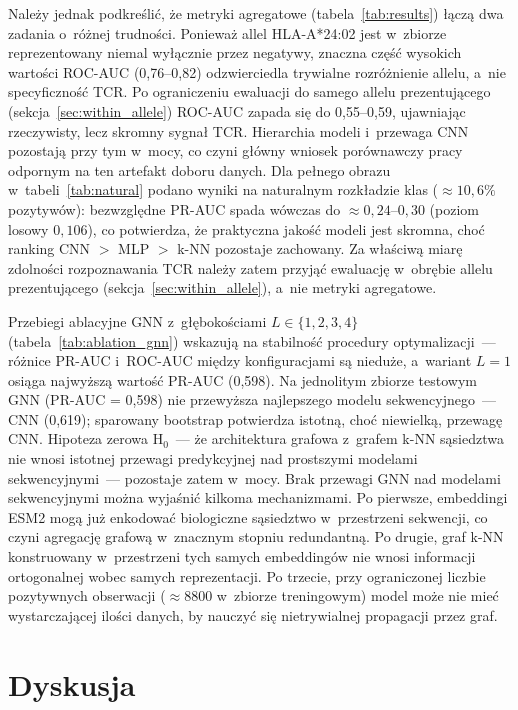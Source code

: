 \documentclass{SGGW-thesis}
\begin{document}
Należy jednak podkreślić, że metryki agregatowe (tabela~\ref{tab:results}) łączą dwa
zadania o~różnej trudności. Ponieważ allel HLA-A*24:02 jest w~zbiorze reprezentowany niemal wyłącznie przez negatywy,
znaczna część wysokich wartości ROC-AUC (0{,}76--0{,}82) odzwierciedla trywialne
rozróżnienie allelu, a~nie specyficzność TCR. Po ograniczeniu ewaluacji do samego allelu
prezentującego (sekcja~\ref{sec:within_allele}) ROC-AUC zapada się do 0{,}55--0{,}59,
ujawniając rzeczywisty, lecz skromny sygnał TCR. Hierarchia modeli i~przewaga CNN
pozostają przy tym w~mocy, co czyni główny wniosek porównawczy pracy odpornym na ten
artefakt doboru danych. Dla pełnego obrazu w~tabeli~\ref{tab:natural} podano wyniki na
naturalnym rozkładzie klas (${\approx}10{,}6\%$ pozytywów): bezwzględne PR-AUC spada wówczas do
${\approx}0{,}24$--$0{,}30$ (poziom losowy $0{,}106$), co potwierdza, że praktyczna jakość modeli
jest skromna, choć ranking CNN $>$ MLP $>$ k-NN pozostaje zachowany. Za właściwą miarę zdolności
rozpoznawania TCR należy zatem przyjąć ewaluację w~obrębie allelu prezentującego
(sekcja~\ref{sec:within_allele}), a~nie metryki agregatowe.

Przebiegi ablacyjne GNN z~głębokościami $L \in \{1, 2, 3, 4\}$ (tabela~\ref{tab:ablation_gnn})
wskazują na stabilność procedury optymalizacji~--- różnice PR-AUC i~ROC-AUC między konfiguracjami
są nieduże, a~wariant $L{=}1$ osiąga najwyższą wartość PR-AUC (0,598).
Na jednolitym zbiorze testowym GNN (PR-AUC = 0,598) nie przewyższa najlepszego modelu
sekwencyjnego~--- CNN (0,619); sparowany bootstrap potwierdza istotną, choć niewielką,
przewagę CNN. Hipoteza zerowa H$_0$~--- że architektura grafowa z~grafem k-NN sąsiedztwa
nie wnosi istotnej przewagi predykcyjnej nad prostszymi modelami sekwencyjnymi~--- pozostaje
zatem w~mocy. Brak przewagi GNN nad modelami
sekwencyjnymi można wyjaśnić kilkoma mechanizmami. Po pierwsze, embeddingi ESM2 mogą już
enkodować biologiczne sąsiedztwo w~przestrzeni sekwencji, co czyni agregację grafową
w~znacznym stopniu redundantną. Po drugie, graf k-NN konstruowany w~przestrzeni tych samych
embeddingów nie wnosi informacji ortogonalnej wobec samych reprezentacji. Po trzecie, przy
ograniczonej liczbie pozytywnych obserwacji (${\approx}8800$ w~zbiorze treningowym) model
może nie mieć wystarczającej ilości danych, by nauczyć się nietrywialnej propagacji przez
graf.

\section{Dyskusja}
\end{document}

